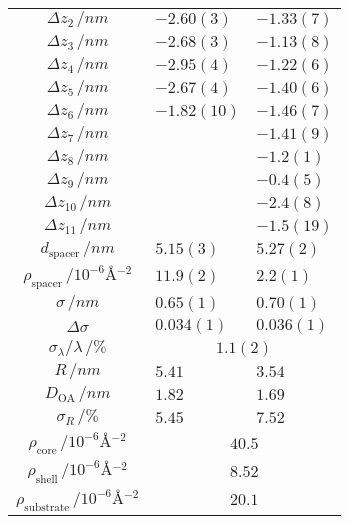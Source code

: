\documentclass[\main/dresen_thesis.tex]{subfiles}
\begin{document}
\begin{table}[!htbp]
\begin{tabular}{ c | l | l }
       $\Delta z_2 \, / \unit{nm} $                                 & $-2.60(3)$        & $-1.33(7)$ \\
       $\Delta z_3 \, / \unit{nm} $                                 & $-2.68(3)$        & $-1.13(8)$ \\
       $\Delta z_4 \, / \unit{nm} $                                 & $-2.95(4)$        & $-1.22(6)$ \\
       $\Delta z_5 \, / \unit{nm} $                                 & $-2.67(4)$        & $-1.40(6)$ \\
       $\Delta z_6 \, / \unit{nm} $                                 & $-1.82(10)$       & $-1.46(7)$ \\
       $\Delta z_7 \, / \unit{nm} $                                 &                   & $-1.41(9)$ \\
       $\Delta z_8 \, / \unit{nm} $                                 &                   & $-1.2(1)$   \\
       $\Delta z_9 \, / \unit{nm} $                                 &                   & $-0.4(5)$    \\
       $\Delta z_{10} \, / \unit{nm} $                              &                   & $-2.4(8)$   \\
       $\Delta z_{11} \, / \unit{nm} $                              &                   & $-1.5(19)$  \\
       \hline
       $d_\mathrm{spacer}   \, / \unit{nm} $                        & $5.15(3)$         & $5.27(2)$  \\
       $\rho_\mathrm{spacer}\, / \unit{10^{-6} \angstrom^{-2}} $    & $11.9(2)$         & $2.2(1)$ \\
       $\sigma     \, / \unit{nm} $                                 & $0.65(1)$         & $0.70(1)$  \\
       $\Delta \sigma$                                              & $0.034(1)$        & $0.036(1)$ \\
       $\sigma_\lambda / \lambda\, / \unit{\%}$                     & \multicolumn{2}{c}{$1.1(2)$} \\
      \hline
       $R             \, / \unit{nm}$                               & $5.41$         & $3.54$ \\
       $D_\mathrm{OA} \, / \unit{nm}$                               & $1.82$         & $1.69$ \\
       $\sigma_R      \, / \unit{\%}$                               & $5.45$         & $7.52$ \\
       $\rho_\mathrm{core}\, / \unit{10^{-6} \angstrom^{-2}}      $ & \multicolumn{2}{c}{$40.5$}\\
       $\rho_\mathrm{shell}\, / \unit{10^{-6} \angstrom^{-2}}     $ & \multicolumn{2}{c}{$8.52$}\\
       $\rho_\mathrm{substrate}\, / \unit{10^{-6} \angstrom^{-2}} $ & \multicolumn{2}{c}{$20.1$}\\
      \hline
    \end{tabular}
  \end{table}
\end{document}

